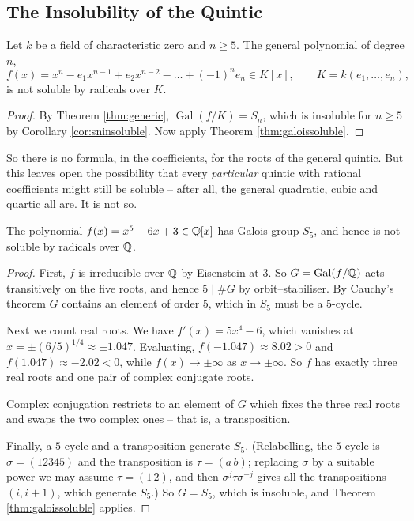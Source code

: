 \documentclass[a4paper]{scrartcl}
\newcommand{\Gal}{\operatorname{Gal}}
\begin{document}
\subsection{The Insolubility of the Quintic}

\begin{theorem}\label{thm:generalquintic}
	Let $k$ be a field of characteristic zero and $n \geq 5$. The general polynomial of degree $n$,
	$$f(x) = x^n - e_1x^{n-1}+e_2x^{n-2}-\dots+(-1)^ne_n \in K[x], \qquad K = k(e_1,\dots,e_n),$$
	is not soluble by radicals over $K$.
\end{theorem}

\begin{proof}
	By Theorem \ref{thm:generic}, $\Gal(f/K) = S_n$, which is insoluble for $n\geq 5$ by Corollary \ref{cor:sninsoluble}. Now apply Theorem \ref{thm:galoissoluble}.
\end{proof}

So there is no formula, in the coefficients, for the roots of the general quintic. But this leaves open the possibility that every \emph{particular} quintic with rational coefficients might still be soluble -- after all, the general quadratic, cubic and quartic all are. It is not so.

\begin{theorem}
	The polynomial $f(x) = x^5 - 6x + 3 \in \mathbb{Q}[x]$ has Galois group $S_5$, and hence is not soluble by radicals over $\mathbb{Q}$.
\end{theorem}

\begin{proof}
	First, $f$ is irreducible over $\mathbb{Q}$ by Eisenstein at $3$. So $G = \Gal(f/\Q)$ acts transitively on the five roots, and hence $5 \mid \#G$ by orbit--stabiliser. By Cauchy's theorem $G$ contains an element of order $5$, which in $S_5$ must be a $5$-cycle.

	Next we count real roots. We have $f'(x) = 5x^4-6$, which vanishes at $x = \pm(6/5)^{1/4}\approx\pm1.047$. Evaluating, $f(-1.047)\approx 8.02 > 0$ and $f(1.047)\approx -2.02 < 0$, while $f(x)\to\pm\infty$ as $x \to\pm\infty$. So $f$ has exactly three real roots and one pair of complex conjugate roots.

	Complex conjugation restricts to an element of $G$ which fixes the three real roots and swaps the two complex ones -- that is, a transposition.

	Finally, a $5$-cycle and a transposition generate $S_5$. (Relabelling, the $5$-cycle is $\sigma = (1 2 3 4 5)$ and the transposition is $\tau = (a\, b)$; replacing $\sigma$ by a suitable power we may assume $\tau = (1\,2)$, and then $\sigma^{j}\tau\sigma^{-j}$ gives all the transpositions $(i, i+1)$, which generate $S_5$.) So $G = S_5$, which is insoluble, and Theorem \ref{thm:galoissoluble} applies.
\end{proof}
\end{document}
